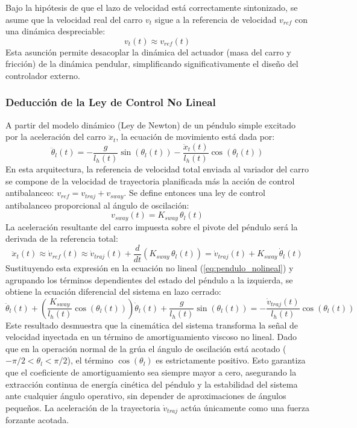 \documentclass[11pt]{article}                                    %
\begin{document}
Bajo la hipótesis de que el lazo de velocidad está correctamente sintonizado, se asume que la velocidad real del carro $v_t$ sigue a la referencia de velocidad $v_{ref}$ con una dinámica despreciable:
\begin{equation}
    v_t(t) \approx v_{ref}(t)
\end{equation}
Esta asunción permite desacoplar la dinámica del actuador (masa del carro y fricción) de la dinámica pendular, simplificando significativamente el diseño del controlador externo.

\subsubsection{Deducción de la Ley de Control No Lineal}
A partir del modelo dinámico (Ley de Newton) de un péndulo simple excitado por la aceleración del carro $\ddot{x}_t$, la ecuación de movimiento está dada por:
\begin{equation}
    \ddot{\theta}_l(t) = -\frac{g}{l_h(t)}\sin(\theta_l(t)) - \frac{\ddot{x}_t(t)}{l_h(t)}\cos(\theta_l(t))
    \label{eq:pendulo_nolineal}
\end{equation}
En esta arquitectura, la referencia de velocidad total enviada al variador del carro se compone de la velocidad de trayectoria planificada más la acción de control antibalanceo: $v_{ref} = v_{traj} + v_{sway}$. 
Se define entonces una ley de control antibalanceo proporcional al ángulo de oscilación:
\begin{equation}
    v_{sway}(t) = K_{sway} \, \theta_l(t)
    \label{eq:ley_control}
\end{equation}
La aceleración resultante del carro impuesta sobre el pivote del péndulo será la derivada de la referencia total:
\begin{equation}
    \ddot{x}_t(t) \approx \dot{v}_{ref}(t) \approx \dot{v}_{traj}(t) + \frac{d}{dt}(K_{sway} \, \theta_l(t)) = \dot{v}_{traj}(t) + K_{sway} \, \dot{\theta}_l(t)
\end{equation}
Sustituyendo esta expresión en la ecuación no lineal (\ref{eq:pendulo_nolineal}) y agrupando los términos dependientes del estado del péndulo a la izquierda, se obtiene la ecuación diferencial del sistema en lazo cerrado:
\begin{equation}
    \ddot{\theta}_l(t) + \left( \frac{K_{sway}}{l_h(t)} \cos(\theta_l(t)) \right) \dot{\theta}_l(t) + \frac{g}{l_h(t)}\sin(\theta_l(t)) = -\frac{\dot{v}_{traj}(t)}{l_h(t)}\cos(\theta_l(t))
    \label{eq:lazo_cerrado_nolineal}
\end{equation}
Este resultado desmuestra que la cinemática del sistema transforma la señal de velocidad inyectada en un término de amortiguamiento viscoso no lineal. Dado que en la operación normal de la grúa el ángulo de oscilación está acotado ($-\pi/2 < \theta_l < \pi/2$), el término $\cos(\theta_l)$ es estrictamente positivo. Esto garantiza que el coeficiente de amortiguamiento sea siempre mayor a cero, asegurando la extracción continua de energía cinética del péndulo y la estabilidad del sistema ante cualquier ángulo operativo, sin depender de aproximaciones de ángulos pequeños. La aceleración de la trayectoria $\dot{v}_{traj}$ actúa únicamente como una fuerza forzante acotada.
\end{document}
